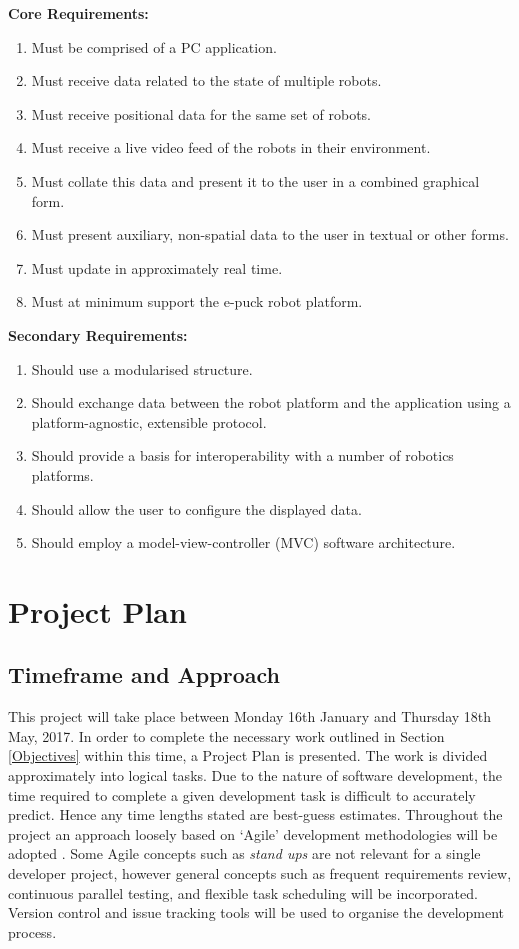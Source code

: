 \documentclass[titlepage,hidelinks,10pt]{article}
\begin{document}
\noindent \textbf{Core Requirements:}
\begin{enumerate}
	\item Must be comprised of a PC application.
	\item Must receive data related to the state of multiple robots.
	\item Must receive positional data for the same set of robots.
	\item Must receive a live video feed of the robots in their environment.
	\item Must collate this data and present it to the user in a combined graphical form.
	\item Must present auxiliary, non-spatial data to the user in textual or other forms.
	\item Must update in approximately real time.
	\item Must at minimum support the e-puck robot platform.
\end{enumerate}

\noindent \textbf{Secondary Requirements:}
\begin{enumerate}
	\item Should use a modularised structure.
	\item Should exchange data between the robot platform and the application using a platform-agnostic, extensible protocol.
	\item Should provide a basis for interoperability with a number of robotics platforms.
	\item Should allow the user to configure the displayed data.
	\item Should employ a model-view-controller (MVC) software architecture.
\end{enumerate}

\section{Project Plan}
\subsection{Timeframe and Approach}
This project will take place between Monday 16th January and Thursday 18th May, 2017. In order to complete the necessary work outlined in Section \ref{Objectives} within this time, a Project Plan is presented. The work is divided approximately into logical tasks.  Due to the nature of software development, the time required to complete a given development task is difficult to accurately predict. Hence any time lengths stated are best-guess estimates. Throughout the project an approach loosely based on `Agile' development methodologies will be adopted \cite{Agile}. Some Agile concepts such as \textit{stand ups} are not relevant for a single developer project, however general concepts such as frequent requirements review, continuous parallel testing, and flexible task scheduling will be incorporated. Version control and issue tracking tools will be used to organise the development process.
\end{document}
